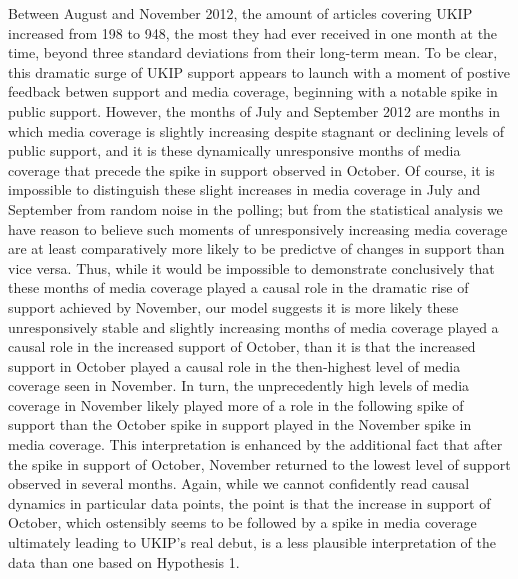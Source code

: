 \documentclass[12pt,]{article}
\begin{document}
Between August and November 2012, the amount of articles covering UKIP
increased from 198 to 948, the most they had ever received in one month
at the time, beyond three standard deviations from their long-term mean.
To be clear, this dramatic surge of UKIP support appears to launch with
a moment of postive feedback betwen support and media coverage,
beginning with a notable spike in public support. However, the months of
July and September 2012 are months in which media coverage is slightly
increasing despite stagnant or declining levels of public support, and
it is these dynamically unresponsive months of media coverage that
precede the spike in support observed in October. Of course, it is
impossible to distinguish these slight increases in media coverage in
July and September from random noise in the polling; but from the
statistical analysis we have reason to believe such moments of
unresponsively increasing media coverage are at least comparatively more
likely to be predictve of changes in support than vice versa. Thus,
while it would be impossible to demonstrate conclusively that these
months of media coverage played a causal role in the dramatic rise of
support achieved by November, our model suggests it is more likely these
unresponsively stable and slightly increasing months of media coverage
played a causal role in the increased support of October, than it is
that the increased support in October played a causal role in the
then-highest level of media coverage seen in November. In turn, the
unprecedently high levels of media coverage in November likely played
more of a role in the following spike of support than the October spike
in support played in the November spike in media coverage. This
interpretation is enhanced by the additional fact that after the spike
in support of October, November returned to the lowest level of support
observed in several months. Again, while we cannot confidently read
causal dynamics in particular data points, the point is that the
increase in support of October, which ostensibly seems to be followed by
a spike in media coverage ultimately leading to UKIP's real debut, is a
less plausible interpretation of the data than one based on Hypothesis
1.
\end{document}
